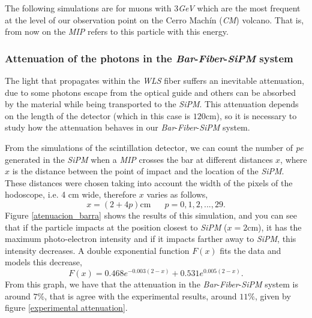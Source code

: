 \documentclass[submitting]{nst}
\begin{document}
The following simulations are for muons with $3$\textsl{GeV} which are the most frequent at the level of our observation point on the Cerro Machín (\textsl{CM}) volcano. That is, from now on the \textsl{MIP} refers to this particle with this energy.

\subsubsection{Attenuation of the photons in the \textsl{Bar}-\textsl{Fiber}-\textsl{SiPM} system}%
The light that propagates within the \textsl{WLS} fiber suffers an inevitable attenuation, due to some photons escape from the optical guide and others can be absorbed by the material while being transported to the \textsl{SiPM}. This attenuation depends on the length of the detector (which in this case is $120$cm), so it is necessary to study how the attenuation behaves in our \textsl{Bar}-\textsl{Fiber}-\textsl{SiPM} system. 

From the simulations of the scintillation detector, we can count the number of \textsl{pe} generated in the \textsl{SiPM} when a \textsl{MIP} crosses the bar at different distances $x$, where $x$ is the distance between the point of impact and the location of the \textsl{SiPM}. These distances were chosen taking into account the width of the pixels of the hodoscope, i.e. 4 cm wide, therefore $x$ varies as follows,
\begin{equation}
    x = (2+4p)\text{cm} \,\,\,\,\,\,\,\,\,\, p=0,1,2,...,29.
\end{equation}
Figure \ref{atenuacion_barra} shows the results of this simulation, and you can see that if the particle impacts at the position closest to \textsl{SiPM} ($x=2$cm), it has the maximum photo-electron intensity and if it impacts farther away to \textsl{SiPM}, this intensity decreases. A double exponential function $F(x)$ fits the data and models this decrease, 
\begin{equation}
F(x)= \text{0.468}e^{-0.003(2-x)} + \text{0.531}e^{0.005(2-x)}.
\end{equation}
From this graph, we have that the attenuation in the \textsl{Bar}-\textsl{Fiber}-\textsl{SiPM} system is around $7$\%, that is agree with the experimental results, around $11\%$, given by figure \ref{experimental attenuation}.
\end{document}
